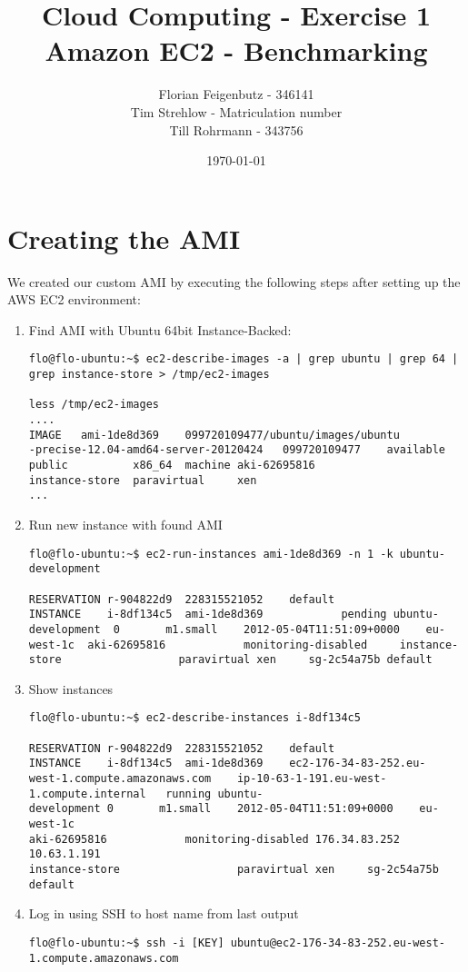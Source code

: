 \documentclass{article}
\title{Cloud Computing - Exercise 1\\
Amazon EC2 - Benchmarking}
\author{Florian Feigenbutz - 346141\\
Tim Strehlow - Matriculation number\\
Till Rohrmann - 343756}
\date{\today}
\begin{document}


\maketitle

\setcounter{section}{1}
\section{Creating the AMI}
We created our custom AMI by executing the following steps after setting up the AWS EC2 environment:
\begin{enumerate}
	\item Find AMI with Ubuntu 64bit Instance-Backed:
\begin{verbatim}
flo@flo-ubuntu:~$ ec2-describe-images -a | grep ubuntu | grep 64 | 
grep instance-store > /tmp/ec2-images

less /tmp/ec2-images
....
IMAGE   ami-1de8d369    099720109477/ubuntu/images/ubuntu
-precise-12.04-amd64-server-20120424   099720109477    available       
public          x86_64  machine aki-62695816                    
instance-store  paravirtual     xen
...
\end{verbatim}
	\item Run new instance with found AMI
\begin{verbatim}
flo@flo-ubuntu:~$ ec2-run-instances ami-1de8d369 -n 1 -k ubuntu-development

RESERVATION	r-904822d9	228315521052	default
INSTANCE	i-8df134c5	ami-1de8d369			pending	ubuntu-development	0		m1.small	2012-05-04T11:51:09+0000	eu-west-1c	aki-62695816			monitoring-disabled		instance-store					paravirtual	xen		sg-2c54a75b	default
\end{verbatim}

	\item Show instances
\begin{verbatim}
flo@flo-ubuntu:~$ ec2-describe-instances i-8df134c5

RESERVATION	r-904822d9	228315521052	default
INSTANCE	i-8df134c5	ami-1de8d369	ec2-176-34-83-252.eu-
west-1.compute.amazonaws.com	ip-10-63-1-191.eu-west-1.compute.internal	running	ubuntu-
development	0		m1.small	2012-05-04T11:51:09+0000	eu-west-1c	
aki-62695816			monitoring-disabled	176.34.83.252	10.63.1.191		
instance-store					paravirtual	xen		sg-2c54a75b	
default
\end{verbatim}

	\item Log in using SSH to host name from last output
\begin{verbatim}
flo@flo-ubuntu:~$ ssh -i [KEY] ubuntu@ec2-176-34-83-252.eu-west-
1.compute.amazonaws.com
\end{verbatim}


\end{enumerate}
\end{document}

